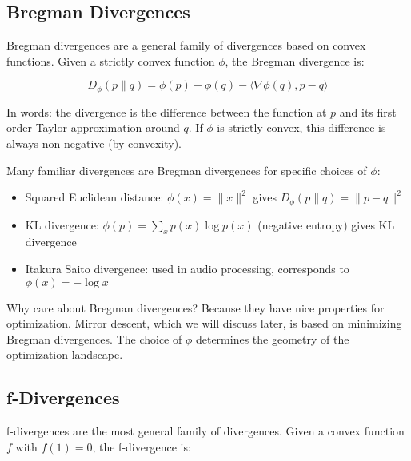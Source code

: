 \vspace{1.5em}

\subsection{Bregman Divergences}

Bregman divergences are a general family of divergences based on convex functions. Given a strictly convex function $\phi$, the Bregman divergence is:

\begin{equation}
D_\phi(p \| q) = \phi(p) - \phi(q) - \langle \nabla \phi(q), p - q \rangle
\end{equation}

In words: the divergence is the difference between the function at $p$ and its first order Taylor approximation around $q$. If $\phi$ is strictly convex, this difference is always non-negative (by convexity).

\vspace{1em}

Many familiar divergences are Bregman divergences for specific choices of $\phi$:

\begin{itemize}
\item Squared Euclidean distance: $\phi(x) = \|x\|^2$ gives $D_\phi(p \| q) = \|p - q\|^2$

\item KL divergence: $\phi(p) = \sum_x p(x) \log p(x)$ (negative entropy) gives KL divergence

\item Itakura Saito divergence: used in audio processing, corresponds to $\phi(x) = -\log x$
\end{itemize}

\vspace{1em}

Why care about Bregman divergences? Because they have nice properties for optimization. Mirror descent, which we will discuss later, is based on minimizing Bregman divergences. The choice of $\phi$ determines the geometry of the optimization landscape.

\vspace{1.5em}

\subsection{f-Divergences}

f-divergences are the most general family of divergences. Given a convex function $f$ with $f(1) = 0$, the f-divergence is:

